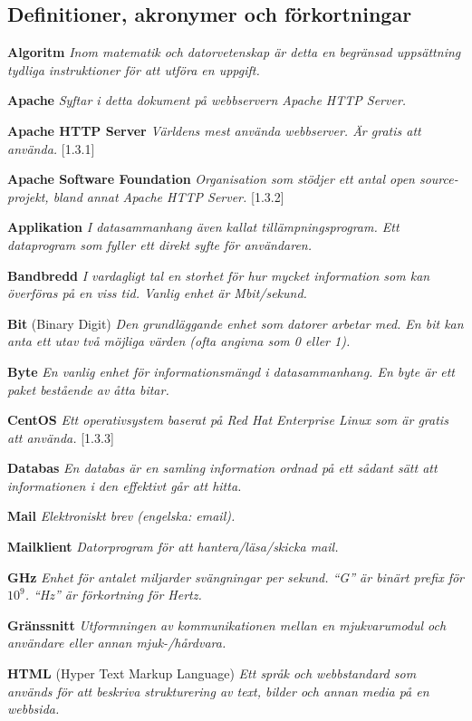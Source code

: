 \documentclass[a4paper, twoside, 11pt, titlepage]{article}
\begin{document}
	\subsection{Definitioner, akronymer och förkortningar}


	\textbf{Algoritm} \emph{Inom matematik och datorvetenskap är detta en begränsad uppsättning tydliga instruktioner för att utföra en uppgift.}

	\textbf{Apache} \emph{Syftar i detta dokument på webbservern  Apache HTTP Server.}

	\textbf{Apache HTTP Server} \emph{Världens mest använda webbserver. Är gratis att använda.} [1.3.1]

	\textbf{Apache Software Foundation} \emph{Organisation som stödjer ett antal open source-projekt, bland annat Apache HTTP Server.} [1.3.2]

	\textbf{Applikation} \emph{I datasammanhang även kallat tillämpningsprogram. Ett dataprogram som fyller ett direkt syfte för användaren.}

	\textbf{Bandbredd} \emph{I vardagligt tal en storhet för hur mycket information som kan överföras på en viss tid. Vanlig enhet är Mbit/sekund.}

	\textbf{Bit} (Binary Digit) \emph{Den grundläggande enhet som datorer arbetar med. En bit kan anta ett utav två möjliga värden (ofta angivna som 0 eller 1).}

	\textbf{Byte} \emph{En vanlig enhet för informationsmängd i datasammanhang. En byte är ett paket bestående av åtta bitar.}

	\textbf{CentOS} \emph{Ett operativsystem baserat på Red Hat Enterprise Linux som är gratis att använda.} [1.3.3]

	\textbf{Databas} \emph{En databas är en samling information ordnad på ett sådant sätt att informationen i den effektivt går att hitta.}

	\textbf{Mail} \emph{Elektroniskt brev (engelska: email).}

	\textbf{Mailklient} \emph{Datorprogram för att hantera/läsa/skicka mail.}

	\textbf{GHz} \emph{Enhet för antalet miljarder svängningar per sekund. ``G'' är binärt prefix för $10^{9}$. ``Hz'' är förkortning för Hertz.}

	\textbf{Gränssnitt} \emph{Utformningen av kommunikationen mellan en mjukvarumodul och användare eller annan mjuk-/hårdvara.}

	\textbf{HTML} (Hyper Text Markup Language) \emph{Ett språk och webbstandard som används för att beskriva strukturering av text, bilder och annan media på en webbsida.}
\end{document}
